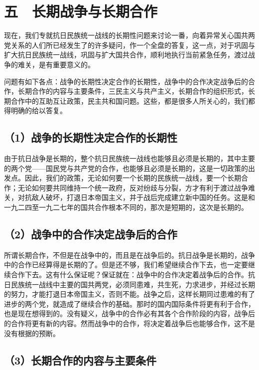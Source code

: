 \section{五　长期战争与长期合作}

现在，我们专就抗日民族统一战线的长期性问题来讨论一番，向着异常关心国共两党关系的人们所已经发生了的许多疑问，作一个全盘的答复，这一点，对于巩固与扩大抗日民族统一战线，巩固与扩大国共合作，顺利地执行当前紧急任务，渡过战争的难关，是有重要意义的。

问题有如下各点：战争的长期性决定合作的长期性，战争中的合作决定战争后的合作，长期合作的内容与主要条件，三民主义与共产主义，长期合作的组织形式，长期合作中的互助互让政策，民主共和国问题。这些，都是很多人所关心的，我们都得明确的给以答复。

\subsection{（1）战争的长期性决定合作的长期性}

由于抗日战争是长期的，整个抗日民族统一战线也能够且必须是长期的，其中主要的两个党——国民党与共产党的合作，也能够且必须是长期的，这是一切政策的出发点。因此，我们的政策，无论如何要一个长期的民族统一战线，要一个长期合作；无论如何要共同维持一个统一政府，反对纷歧与分裂，方才有利于渡过战争难关，对抗敌人破坏，打退日本帝国主义，并于战后完成建立新中国的任务。这是和一九二四至一九二七年的国共合作根本不同的，那次是短期的，这次是长期的。

\subsection{（2）战争中的合作决定战争后的合作}

所谓长期合作，不但是在战争中的，而且是在战争后的。抗日战争是长期的，战争中的合作已经算得是长期的了。但是还不够，我们希望继续合作下去，也一定要继续合作下去。这有什么保证呢？保证就在：战争中的合作决定着战争后的合作。抗日民族统一战线中主要的国共两党，必须同患难，共生死，力求进步，并经过长期的努力，才能打退日本帝国主义，否则不能。战争之后，这样长期同过患难的有了进步的两个党，就造成了继续合作的基础。那时的国内国际条件将更有利于合作，也是现在想得到的。没有疑义，战争中的合作必有其各个合作阶段的内容，战争后的合作将更有新的内容。然而战争中的合作，将决定着战争后也能够合作，这不是没有根据的预断。

\subsection{（3）长期合作的内容与主要条件}

